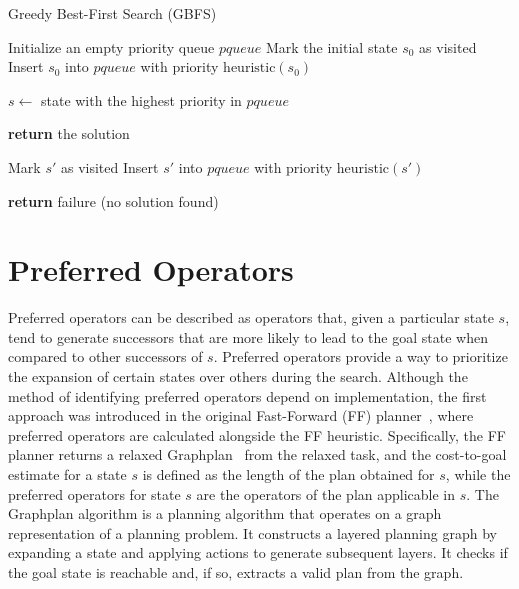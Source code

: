 \documentclass[ppgc,diss,english]{iiufrgs}
\begin{document}
\begin{algorithm}
\caption{Greedy Best-First Search (GBFS)}
\label{alg:gbfs}
\begin{algorithmic}[1]
  \State Initialize an empty priority queue $pqueue$
  \State Mark the initial state $s_0$ as visited
  \State Insert $s_0$ into $pqueue$ with priority $\text{heuristic}(s_0)$

    \State $s \gets$ state with the highest priority in $pqueue$

      \State \textbf{return} the solution
    \EndIf

        \State Mark $s'$ as visited
        \State Insert $s'$ into $pqueue$ with priority $\text{heuristic}(s')$
      \EndIf
    \EndFor
  \EndWhile

  \State \textbf{return} failure (no solution found)
\EndProcedure
\end{algorithmic}
\end{algorithm}

\section{Preferred Operators}
Preferred operators can be described as operators that, given a particular state $s$, tend to generate successors that are more likely to lead to the goal state when compared to other successors of $s$. Preferred operators provide a way to prioritize the expansion of certain states over others during the search. Although the method of identifying preferred operators depend on implementation, the first approach was introduced in the original Fast-Forward (FF) planner~\cite{Hoffmann.Nebel/2001}, where preferred operators are calculated alongside the FF heuristic. Specifically, the FF planner returns a relaxed Graphplan~\cite{Blum.etal/1997} from the relaxed task, and the cost-to-goal estimate for a state $s$ is defined as the length of the plan obtained for $s$, while the preferred operators for state $s$ are the operators of the plan applicable in $s$. The Graphplan algorithm is a planning algorithm that operates on a graph representation of a planning problem. It constructs a layered planning graph by expanding a state and applying actions to generate subsequent layers. It checks if the goal state is reachable and, if so, extracts a valid plan from the graph.
\end{document}
